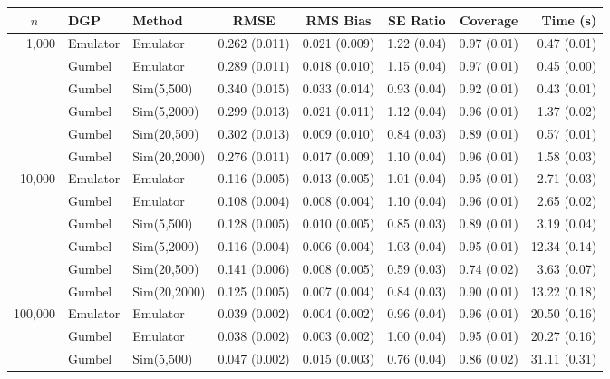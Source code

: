 \begin{table}[htbp]
\centering
\footnotesize
\begin{tabular}{@{}rllrrrrr@{}}
\toprule
\multicolumn{1}{c}{$n$} & \multicolumn{1}{l}{DGP} & \multicolumn{1}{l}{Method} & \multicolumn{1}{c}{RMSE} & \multicolumn{1}{c}{RMS Bias} & \multicolumn{1}{c}{SE Ratio} & \multicolumn{1}{c}{Coverage} & \multicolumn{1}{r}{Time (s)} \\
\midrule
\multirow{6}{*}{1,000} & Emulator & Emulator & 0.262 (0.011) & 0.021 (0.009) & 1.22 (0.04) & 0.97 (0.01) & 0.47 (0.01) \\
 & Gumbel & Emulator & 0.289 (0.011) & 0.018 (0.010) & 1.15 (0.04) & 0.97 (0.01) & 0.45 (0.00) \\
 & Gumbel & Sim(5,500) & 0.340 (0.015) & 0.033 (0.014) & 0.93 (0.04) & 0.92 (0.01) & 0.43 (0.01) \\
 & Gumbel & Sim(5,2000) & 0.299 (0.013) & 0.021 (0.011) & 1.12 (0.04) & 0.96 (0.01) & 1.37 (0.02) \\
 & Gumbel & Sim(20,500) & 0.302 (0.013) & 0.009 (0.010) & 0.84 (0.03) & 0.89 (0.01) & 0.57 (0.01) \\
 & Gumbel & Sim(20,2000) & 0.276 (0.011) & 0.017 (0.009) & 1.10 (0.04) & 0.96 (0.01) & 1.58 (0.03) \\
\midrule
\multirow{6}{*}{10,000} & Emulator & Emulator & 0.116 (0.005) & 0.013 (0.005) & 1.01 (0.04) & 0.95 (0.01) & 2.71 (0.03) \\
 & Gumbel & Emulator & 0.108 (0.004) & 0.008 (0.004) & 1.10 (0.04) & 0.96 (0.01) & 2.65 (0.02) \\
 & Gumbel & Sim(5,500) & 0.128 (0.005) & 0.010 (0.005) & 0.85 (0.03) & 0.89 (0.01) & 3.19 (0.04) \\
 & Gumbel & Sim(5,2000) & 0.116 (0.004) & 0.006 (0.004) & 1.03 (0.04) & 0.95 (0.01) & 12.34 (0.14) \\
 & Gumbel & Sim(20,500) & 0.141 (0.006) & 0.008 (0.005) & 0.59 (0.03) & 0.74 (0.02) & 3.63 (0.07) \\
 & Gumbel & Sim(20,2000) & 0.125 (0.005) & 0.007 (0.004) & 0.84 (0.03) & 0.90 (0.01) & 13.22 (0.18) \\
\midrule
\multirow{6}{*}{100,000} & Emulator & Emulator & 0.039 (0.002) & 0.004 (0.002) & 0.96 (0.04) & 0.96 (0.01) & 20.50 (0.16) \\
 & Gumbel & Emulator & 0.038 (0.002) & 0.003 (0.002) & 1.00 (0.04) & 0.95 (0.01) & 20.27 (0.16) \\
 & Gumbel & Sim(5,500) & 0.047 (0.002) & 0.015 (0.003) & 0.76 (0.04) & 0.86 (0.02) & 31.11 (0.31) \\

\end{tabular}
\end{table}
